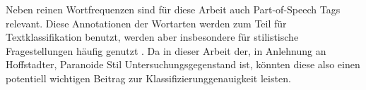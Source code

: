 Neben reinen Wortfrequenzen sind für diese Arbeit auch Part-of-Speech Tags relevant.
Diese Annotationen der Wortarten werden zum Teil für Textklassifikation benutzt, werden aber insbesondere für stilistische Fragestellungen häufig genutzt \parencite[vgl.][]{jimenez_2020}.
Da in dieser Arbeit der, in Anlehnung an Hoffstadter, Paranoide Stil Untersuchungsgegenstand ist, könnten diese also einen potentiell wichtigen Beitrag zur Klassifizierunggenauigkeit leisten.
